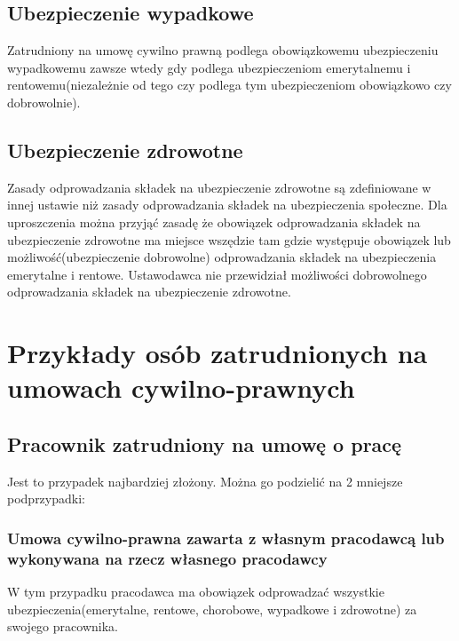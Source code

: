 \subsection[Ubezpieczenie wypadkowe][Ubezpieczenie wypadkowe]{Ubezpieczenie wypadkowe}
Zatrudniony na umowę cywilno prawną podlega obowiązkowemu ubezpieczeniu wypadkowemu zawsze wtedy gdy podlega ubezpieczeniom emerytalnemu i rentowemu(niezależnie od tego czy podlega tym ubezpieczeniom obowiązkowo czy dobrowolnie).

\subsection[Ubezpieczenie zdrowotne][Ubezpieczenie zdrowotne]{Ubezpieczenie zdrowotne}
Zasady odprowadzania składek na ubezpieczenie zdrowotne są zdefiniowane w innej ustawie niż zasady odprowadzania składek na ubezpieczenia społeczne. Dla uproszczenia można przyjąć zasadę że obowiązek odprowadzania składek na ubezpieczenie zdrowotne ma miejsce wszędzie tam gdzie występuje obowiązek lub możliwość(ubezpieczenie dobrowolne) odprowadzania składek na ubezpieczenia emerytalne i rentowe. Ustawodawca nie przewidział możliwości dobrowolnego odprowadzania składek na ubezpieczenie zdrowotne.

\section[Przykłady osób zatrudnionych na umowach cywilno-prawnych][Przykłady osób zatrudnionych na umowach cywilno-prawnych]{Przykłady osób zatrudnionych na umowach cywilno-prawnych}
\label{przykladyOsob}

\subsection[Pracownik zatrudniony na umowę o pracę][Pracownik zatrudniony na umowę o pracę]{Pracownik zatrudniony na umowę o pracę}
\label{umowaOPrace}
Jest to przypadek najbardziej złożony. Można go podzielić na 2 mniejsze podprzypadki:

\subsubsection{Umowa cywilno-prawna zawarta z własnym pracodawcą lub wykonywana na rzecz własnego pracodawcy}
W tym przypadku pracodawca ma obowiązek odprowadzać wszystkie ubezpieczenia(emerytalne, rentowe, chorobowe, wypadkowe i zdrowotne) za swojego pracownika.

